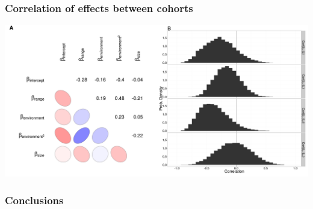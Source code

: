 \documentclass{beamer}
\begin{document}
\begin{frame}
  \frametitle{Correlation of effects between cohorts}
  
  \begin{center}
    \includegraphics[width = \textwidth,height = 0.9\textheight,keepaspectratio = true]{figure/cor_mixed}
  \end{center}
\end{frame}


\begin{frame}
  \frametitle{Conclusions}
\end{frame}
\end{document}

